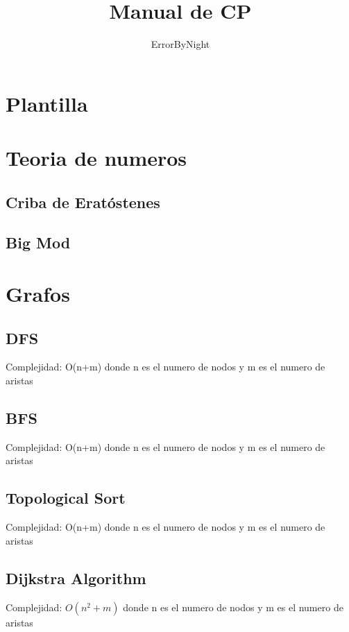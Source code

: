\documentclass[10pt,a4paper,twocolumn]{article}
\begin{document}
	\title{Manual de CP}
	\author{ErrorByNight}
	\date{}
	\maketitle
	
	\tableofcontents
	\newpage
	\section{Plantilla}
		
	\newpage
	
	\section{Teoria de numeros}
	\subsection{Criba de Eratóstenes}
	
	
	\subsection{Big Mod}
	
	
	
	\section{Grafos}
	\subsection{DFS}
		Complejidad: O(n+m) donde n es el numero de nodos y m es el numero de aristas
		
		
		\subsection{BFS}
Complejidad: O(n+m) donde n es el numero de nodos y m es el numero de aristas
		
		
		\subsection{Topological Sort}
Complejidad: O(n+m) donde n es el numero de nodos y m es el numero de aristas
		
		 
		
		\subsection{Dijkstra Algorithm}
Complejidad: $O(n^2+m)$ donde n es el numero de nodos y m es el numero de aristas
		
		
\end{document}
